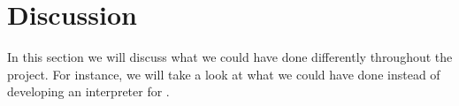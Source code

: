 \section{Discussion}
\label{sec:discussion}

In this section we will discuss what we could have done differently throughout
the project. For instance, we will take a look at what we could have done
instead of developing an interpreter for \productname{}.


